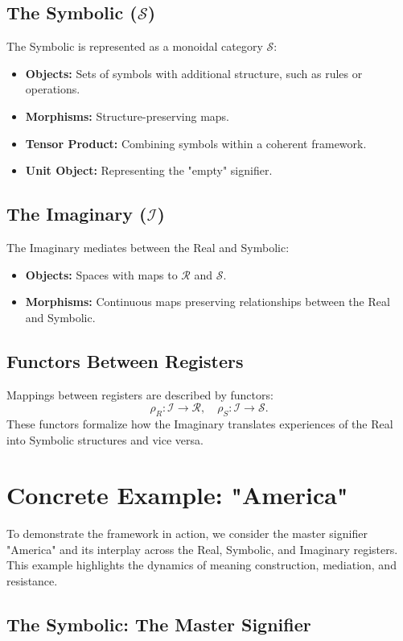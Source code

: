 \documentclass{article}
\begin{document}
\subsection{The Symbolic ($\mathscr{S}$)}
The Symbolic is represented as a monoidal category $\mathscr{S}$:
\begin{itemize}
    \item \textbf{Objects:} Sets of symbols with additional structure, such as rules or operations.
    \item \textbf{Morphisms:} Structure-preserving maps.
    \item \textbf{Tensor Product:} Combining symbols within a coherent framework.
    \item \textbf{Unit Object:} Representing the "empty" signifier.
\end{itemize}

\subsection{The Imaginary ($\mathscr{I}$)}
The Imaginary mediates between the Real and Symbolic:
\begin{itemize}
    \item \textbf{Objects:} Spaces with maps to $\mathscr{R}$ and $\mathscr{S}$.
    \item \textbf{Morphisms:} Continuous maps preserving relationships between the Real and Symbolic.
\end{itemize}

\subsection{Functors Between Registers}
Mappings between registers are described by functors:
\[
\rho_R: \mathscr{I} \to \mathscr{R}, \quad \rho_S: \mathscr{I} \to \mathscr{S}.
\]
These functors formalize how the Imaginary translates experiences of the Real into Symbolic structures and vice versa.

\section{Concrete Example: "America"}

To demonstrate the framework in action, we consider the master signifier "America" and its interplay across the Real, Symbolic, and Imaginary registers. This example highlights the dynamics of meaning construction, mediation, and resistance.

\subsection{The Symbolic: The Master Signifier}
\end{document}
